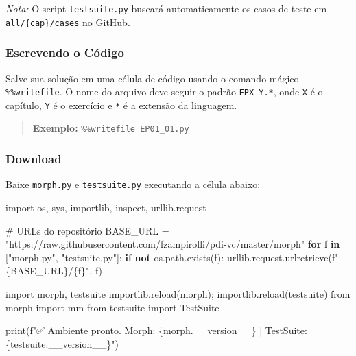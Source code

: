 \documentclass[
  portuguese,
  letterpaper,
  openany,
  oneside,
  12pt,
  a4paper]{book}
\newenvironment{Shaded}{\begin{snugshade}}{\end{snugshade}}
\newcommand{\BuiltInTok}[1]{\textcolor[rgb]{0.00,0.23,0.31}{#1}}
\newcommand{\CommentTok}[1]{\textcolor[rgb]{0.37,0.37,0.37}{#1}}
\newcommand{\ControlFlowTok}[1]{\textcolor[rgb]{0.00,0.23,0.31}{\textbf{#1}}}
\newcommand{\ImportTok}[1]{\textcolor[rgb]{0.00,0.46,0.62}{#1}}
\newcommand{\KeywordTok}[1]{\textcolor[rgb]{0.00,0.23,0.31}{\textbf{#1}}}
\newcommand{\NormalTok}[1]{\textcolor[rgb]{0.00,0.23,0.31}{#1}}
\newcommand{\OperatorTok}[1]{\textcolor[rgb]{0.37,0.37,0.37}{#1}}
\newcommand{\SpecialCharTok}[1]{\textcolor[rgb]{0.37,0.37,0.37}{#1}}
\newcommand{\SpecialStringTok}[1]{\textcolor[rgb]{0.13,0.47,0.30}{#1}}
\newcommand{\StringTok}[1]{\textcolor[rgb]{0.13,0.47,0.30}{#1}}
\begin{document}
\emph{Nota:} O script \texttt{testsuite.py} buscará automaticamente os
casos de teste em \texttt{all/\{cap\}/cases} no
\href{https://github.com/fzampirolli/pdi-vc/tree/master/all}{GitHub}.

\subsubsection*{Escrevendo o Código}\label{escrevendo-o-cuxf3digo}

Salve sua solução em uma célula de código usando o comando mágico
\texttt{\%\%writefile}. O nome do arquivo deve seguir o padrão
\texttt{EPX\_Y.*}, onde \texttt{X} é o capítulo, \texttt{Y} é o
exercício e \texttt{*} é a extensão da linguagem.

\begin{quote}
\textbf{Exemplo:} \texttt{\%\%writefile\ EP01\_01.py}
\end{quote}

\subsubsection*{Download}\label{download}

Baixe \texttt{morph.py} e \texttt{testsuite.py} executando a célula
abaixo:

\begin{Shaded}
\begin{Highlighting}[]
\ImportTok{import}\NormalTok{ os, sys, importlib, inspect, urllib.request}

\CommentTok{\# URLs do repositório}
\NormalTok{BASE\_URL }\OperatorTok{=} \StringTok{"https://raw.githubusercontent.com/fzampirolli/pdi{-}vc/master/morph"}
\ControlFlowTok{for}\NormalTok{ f }\KeywordTok{in}\NormalTok{ [}\StringTok{"morph.py"}\NormalTok{, }\StringTok{"testsuite.py"}\NormalTok{]:}
    \ControlFlowTok{if} \KeywordTok{not}\NormalTok{ os.path.exists(f):}
\NormalTok{        urllib.request.urlretrieve(}\SpecialStringTok{f"}\SpecialCharTok{\{}\NormalTok{BASE\_URL}\SpecialCharTok{\}}\SpecialStringTok{/}\SpecialCharTok{\{}\NormalTok{f}\SpecialCharTok{\}}\SpecialStringTok{"}\NormalTok{, f)}

\ImportTok{import}\NormalTok{ morph, testsuite}
\NormalTok{importlib.}\BuiltInTok{reload}\NormalTok{(morph)}\OperatorTok{;}\NormalTok{ importlib.}\BuiltInTok{reload}\NormalTok{(testsuite)}
\ImportTok{from}\NormalTok{ morph }\ImportTok{import}\NormalTok{ mm}
\ImportTok{from}\NormalTok{ testsuite }\ImportTok{import}\NormalTok{ TestSuite}

\BuiltInTok{print}\NormalTok{(}\SpecialStringTok{f"✅ Ambiente pronto. Morph: }\SpecialCharTok{\{}\NormalTok{morph}\SpecialCharTok{.}\NormalTok{\_\_version\_\_}\SpecialCharTok{\}}\SpecialStringTok{ | TestSuite: }\SpecialCharTok{\{}\NormalTok{testsuite}\SpecialCharTok{.}\NormalTok{\_\_version\_\_}\SpecialCharTok{\}}\SpecialStringTok{"}\NormalTok{)}
\end{Highlighting}
\end{Shaded}
\end{document}
